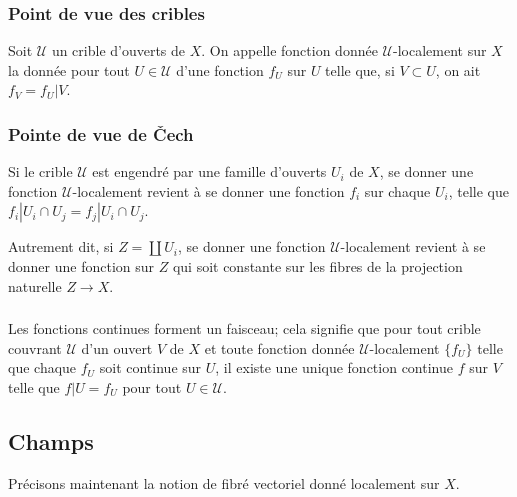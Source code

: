 \documentclass{book}
\newcommand{\sU}{\mathscr{U}}
\begin{document}
\subsubsection{Point de vue des cribles}\label{I:1-2-1}

Soit $\sU$ un crible d'ouverts de $X$. On appelle fonction donnée 
$\sU$-localement sur $X$ la donnée pour tout $U\in \sU$ d'une fonction $f_U$ 
sur $U$ telle que, si $V\subset U$, on ait $f_V=f_U|V$. 





\subsubsection{Pointe de vue de Čech}\label{I:1-2-2}

Si le crible $\sU$ est engendré par une famille d'ouverts $U_i$ de $X$, se 
donner une fonction $\sU$-localement revient à se donner une fonction $f_i$ 
sur chaque $U_i$, telle que $f_i|{U_i\cap U_j} = f_j|{U_i\cap U_j}$. 

Autrement dit, si $Z=\coprod U_i$, se donner une fonction $\sU$-localement 
revient à se donner une fonction sur $Z$ qui soit constante sur les fibres de 
la projection naturelle $Z\to X$. 





\subsubsection{}\label{I:1-2-3}

Les fonctions continues forment un faisceau; cela signifie que pour tout crible 
couvrant $\sU$ d'un ouvert $V$ de $X$ et toute fonction donnée 
$\sU$-localement $\{f_U\}$ telle que chaque $f_U$ soit continue sur $U$, il 
existe une unique fonction continue $f$ sur $V$ telle que $f|U=f_U$ pour tout 
$U\in \sU$.










\subsection{Champs}\label{I:1-3}

Précisons maintenant la notion de fibré vectoriel donné localement sur $X$. 
\end{document}
